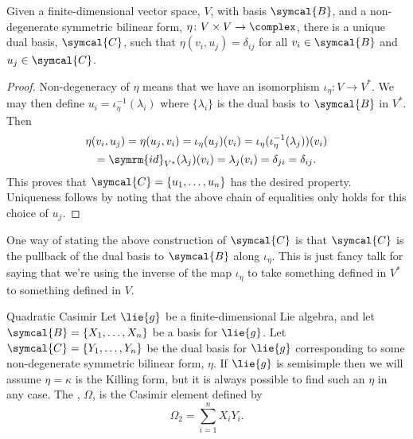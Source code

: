 \documentclass[fleqn]{NotesClass}
\newcommand{\id}{\symrm{id}}
\newcommand{\basis}{\symcal{B}}
\begin{document}
    \begin{lma}{}{}
        Given a finite-dimensional vector space, \(V\), with basis \(\basis\), and a non-degenerate symmetric bilinear form, \(\eta \colon V\times V \to \complex\), there is a unique dual basis, \(\symcal{C}\), such that \(\eta(v_i, u_j) = \delta_{ij}\) for all \(v_i \in \basis\) and \(u_j \in \symcal{C}\).
        \begin{proof}
            Non-degeneracy of \(\eta\) means that we have an isomorphism \(\iota_\eta \colon V \to V^*\).
            We may then define \(u_i = \iota_\eta^{-1}(\lambda_i)\) where \(\{\lambda_i\}\) is the dual basis to \(\basis\) in \(V^*\).
            Then
            \begin{multline}
                \eta(v_i, u_j) = \eta(u_j, v_i) = \iota_\eta(u_j)(v_i) = \iota_\eta(\iota_\eta^{-1}(\lambda_j))(v_i)\\
                = \id_{V^*}(\lambda_j)(v_i) = \lambda_j(v_i) = \delta_{ji} = \delta_{ij}.  
            \end{multline}
            This proves that \(\symcal{C} = \{u_1, \dotsc, u_n\}\) has the desired property.
            Uniqueness follows by noting that the above chain of equalities only holds for this choice of \(u_j\).
        \end{proof}
    \end{lma}
    
    One way of stating the above construction of \(\symcal{C}\) is that \(\symcal{C}\) is the pullback of the dual basis to \(\basis\) along \(\iota_\eta\).
    This is just fancy talk for saying that we're using the inverse of the map \(\iota_\eta\) to take something defined in \(V^*\) to something defined in \(V\).
    
     \begin{dfn}{Quadratic Casimir}{}
         Let \(\lie{g}\) be a finite-dimensional Lie algebra, and let \(\basis = \{X_1, \dotsc, X_n\}\) be a basis for \(\lie{g}\).
         Let \(\symcal{C} = \{Y_1, \dotsc, Y_n\}\) be the dual basis for \(\lie{g}\) corresponding to some non-degenerate symmetric bilinear form, \(\eta\).
         If \(\lie{g}\) is semisimple then we will assume \(\eta = \kappa\) is the Killing form, but it is always possible to find such an \(\eta\) in any case.
         The , \(\Omega\), is the Casimir element defined by
         \begin{equation}
             \Omega_2 = \sum_{i=1}^{n} X_i Y_i.
         \end{equation}
     \end{dfn}
     
\end{document}
